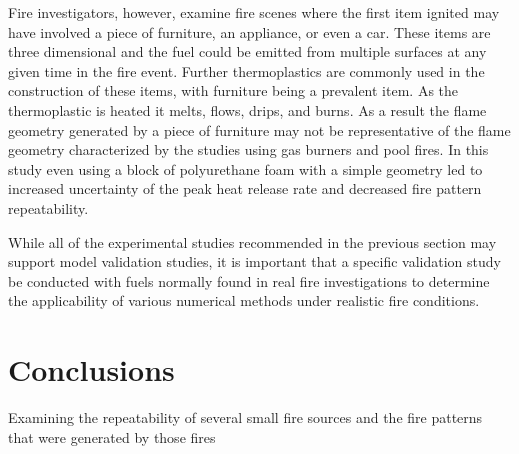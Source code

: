 \documentclass[twoside]{uocthesis}
\begin{document}
{Fire investigators, however, examine fire scenes where the first item ignited may have involved a piece of furniture, an appliance, or even a car.   These items are three dimensional and the fuel could be emitted from multiple surfaces at any given time in the fire event.  Further thermoplastics are commonly used in the construction of these items, with furniture being a prevalent item.  As the thermoplastic is heated it melts, flows, drips, and burns.   As a result the flame geometry generated by a piece of furniture may not be representative of the flame geometry characterized by the studies using gas burners and pool fires.  In this study even using a block of polyurethane foam with a simple geometry led to increased uncertainty of the peak heat release rate and decreased fire pattern repeatability.  

While all of the experimental studies recommended in the previous section may support model validation studies, it is important that a specific validation study be conducted with fuels normally found in real fire investigations to determine the applicability of various numerical methods under realistic fire conditions. 

\chapter{Conclusions}

Examining the repeatability of several small fire sources and the fire patterns that were generated by those fires

}
\end{document}

